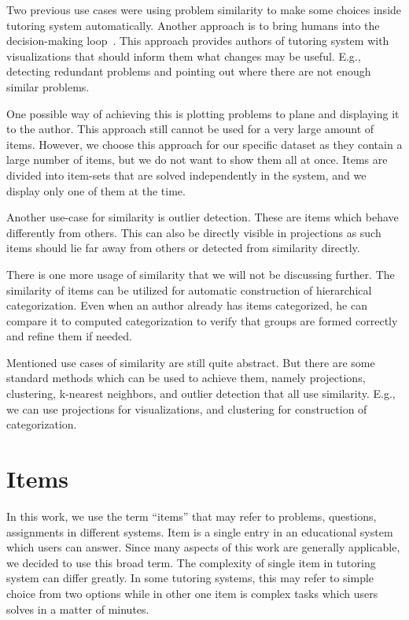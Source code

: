 \documentclass[
  printed, %
  table,   %
  nolof,     %
  nolot,     %
  color,
  final,
  nocover
]{fithesis3}
\begin{document}
Two previous use cases were using problem similarity to make some choices inside tutoring system automatically. Another approach is to bring humans into the decision-making loop~\cite{baker2016stupid}. This approach provides authors of tutoring system with visualizations that should inform them what changes may be useful. E.g., detecting redundant problems and pointing out where there are not enough similar problems.

One possible way of achieving this is plotting problems to plane and displaying it to the author. This approach still cannot be used for a very large amount of items. However, we choose this approach for our specific dataset as they contain a large number of items, but we do not want to show them all at once. Items are divided into item-sets that are solved independently in the system, and we display only one of them at the time.

Another use-case for similarity is outlier detection. These are items which behave differently from others. This can also be directly visible in projections as such items should lie far away from others or detected from similarity directly.

There is one more usage of similarity that we will not be discussing further. The similarity of items can be utilized for automatic construction of hierarchical categorization. Even when an author already has items categorized, he can compare it to computed categorization to verify that groups are formed correctly and refine them if needed.


Mentioned use cases of similarity are still quite abstract. But there are some standard methods which can be used to achieve them, namely projections, clustering, k-nearest neighbors, and outlier detection that all use similarity. E.g., we can use projections for visualizations, and clustering for construction of categorization.


\section{Items}\label{items}


In this work, we use the term ``items'' that may refer to problems, questions, assignments in different systems. Item is a single entry in an educational system which users can answer. Since many aspects of this work are generally applicable, we decided to use this broad term. The complexity of single item in tutoring system can differ greatly. In some tutoring systems, this may refer to simple choice from two options while in other one item is complex tasks which users solves in a matter of minutes.
\end{document}
